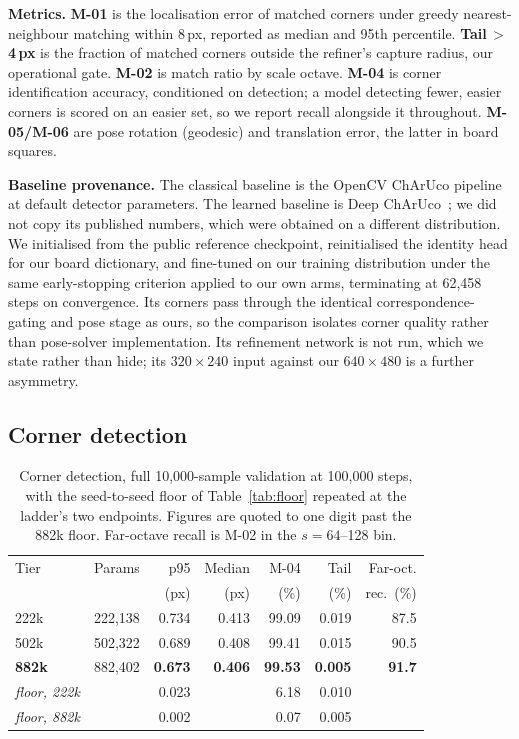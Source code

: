 \documentclass[10pt,twocolumn,letterpaper]{article}
\begin{document}
\textbf{Metrics.} \textbf{M-01} is the localisation error of matched corners under greedy
nearest-neighbour matching within 8\,px, reported as median and 95th percentile.
\textbf{Tail\,$>$\,4\,px} is the fraction of matched corners outside the refiner's capture radius,
our operational gate. \textbf{M-02} is match ratio by scale octave. \textbf{M-04} is corner
identification accuracy, conditioned on detection; a model detecting fewer, easier corners is
scored on an easier set, so we report recall alongside it throughout. \textbf{M-05/M-06} are pose
rotation (geodesic) and translation error, the latter in board squares.

\textbf{Baseline provenance.} The classical baseline is the OpenCV ChArUco pipeline at default
detector parameters. The learned baseline is Deep ChArUco~\cite{hu2019}; we did not copy its
published numbers, which were obtained on a different distribution. We initialised from the public
reference checkpoint, reinitialised the identity head for our board dictionary, and fine-tuned on
our training distribution under the same early-stopping criterion applied to our own arms,
terminating at 62,458 steps on convergence. Its corners pass through the identical
correspondence-gating and pose stage as ours, so the comparison isolates corner quality rather than
pose-solver implementation. Its refinement network is not run, which we state rather than hide; its
$320\times240$ input against our $640\times480$ is a further asymmetry.

\subsection{Corner detection}
\label{sec:detect}

\begin{table}[t]
\centering\small
\setlength{\tabcolsep}{4pt}
\begin{tabular}{lrrrrrr}
\toprule
Tier & Params & p95 & Median & M-04 & Tail & Far-oct. \\
 & & (px) & (px) & (\%) & (\%) & rec.\ (\%) \\
\midrule
222k & 222,138 & 0.734 & 0.413 & 99.09 & 0.019 & 87.5 \\
502k & 502,322 & 0.689 & 0.408 & 99.41 & 0.015 & 90.5 \\
\textbf{882k} & 882,402 & \textbf{0.673} & \textbf{0.406} & \textbf{99.53} & \textbf{0.005} & \textbf{91.7} \\
\midrule
\emph{floor, 222k} & & 0.023 & & 6.18 & 0.010 & \\
\emph{floor, 882k} & & 0.002 & & 0.07 & 0.005 & \\
\bottomrule
\end{tabular}
\caption{Corner detection, full 10,000-sample validation at 100,000 steps, with the seed-to-seed
floor of Table~\ref{tab:floor} repeated at the ladder's two endpoints. Figures are quoted to one
digit past the 882k floor. Far-octave recall is M-02 in the $s = 64$--128 bin.}
\label{tab:detector}
\end{table}
\end{document}
